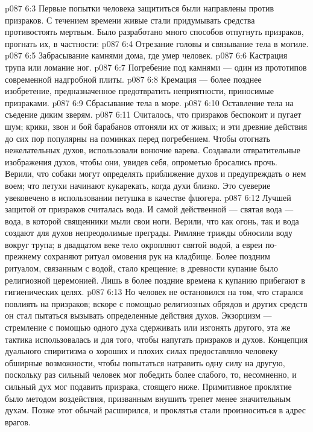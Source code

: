 \vs p087 6:3 Первые попытки человека защититься были направлены против призраков. С течением времени живые стали придумывать средства противостоять мертвым. Было разработано много способов отпугнуть призраков, прогнать их, в частности:
\vs p087 6:4 \bibnobreakspace Отрезание головы и связывание тела в могиле.
\vs p087 6:5 \bibnobreakspace Забрасывание камнями дома, где умер человек.
\vs p087 6:6 \bibnobreakspace Кастрация трупа или ломание ног.
\vs p087 6:7 \bibnobreakspace Погребение под камнями --- один из прототипов современной надгробной плиты.
\vs p087 6:8 \bibnobreakspace Кремация --- более позднее изобретение, предназначенное предотвратить неприятности, приносимые призраками.
\vs p087 6:9 \bibnobreakspace Сбрасывание тела в море.
\vs p087 6:10 \bibnobreakspace Оставление тела на съедение диким зверям.
\vs p087 6:11 \pc Считалось, что призраков беспокоит и пугает шум; крики, звон и бой барабанов отгоняли их от живых; и эти древние действия до сих пор популярны на поминках перед погребением. Чтобы отогнать нежелательных духов, использовали вонючие варева. Создавали отвратительные изображения духов, чтобы они, увидев себя, опрометью бросались прочь. Верили, что собаки могут определять приближение духов и предупреждать о нем воем; что петухи начинают кукарекать, когда духи близко. Это суеверие увековечено в использовании петушка в качестве флюгера.
\vs p087 6:12 Лучшей защитой от призраков считалась вода. И самой действенной --- святая вода --- вода, в которой священники мыли свои ноги. Верили, что как огонь, так и вода создают для духов непреодолимые преграды. Римляне трижды обносили воду вокруг трупа; в двадцатом веке тело окропляют святой водой, а евреи по\hyp{}прежнему сохраняют ритуал омовения рук на кладбище. Более поздним ритуалом, связанным с водой, стало крещение; в древности купание было религиозной церемонией. Лишь в более поздние времена к купанию прибегают в гигиенических целях.
\vs p087 6:13 Но человек не остановился на том, что старался повлиять на призраков; вскоре с помощью религиозных обрядов и других средств он стал пытаться вызывать определенные действия духов. Экзорцизм --- стремление с помощью одного духа сдерживать или изгонять другого, эта же тактика использовалась и для того, чтобы напугать призраков и духов. Концепция дуального спиритизма о хороших и плохих силах предоставляло человеку обширные возможности, чтобы попытаться натравить одну силу на другую, поскольку раз сильный человек мог победить более слабого, то, несомненно, и сильный дух мог подавить призрака, стоящего ниже. Примитивное проклятие было методом воздействия, призванным внушить трепет менее значительным духам. Позже этот обычай расширился, и проклятья стали произноситься в адрес врагов.
